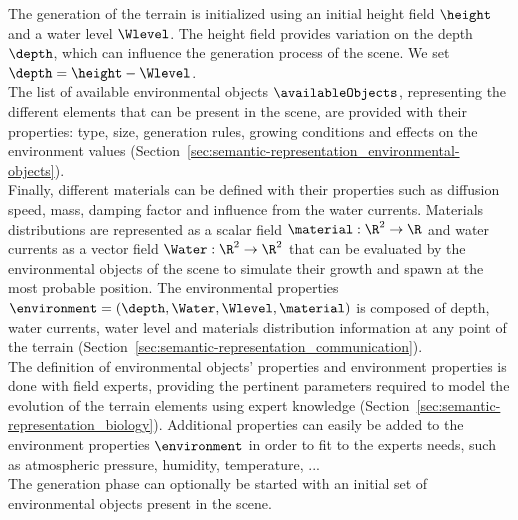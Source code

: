 The generation of the terrain is initialized using an initial height field $\height$ and a water level $\Wlevel$. The height field provides variation on the depth $\depth$, which can influence the generation process of the scene. We set $\depth = \height - \Wlevel$. \\
The list of available environmental objects $\availableObjects$, representing the different elements that can be present in the scene, are provided with their properties: type, size, generation rules, growing conditions and effects on the environment values (Section~\ref{sec:semantic-representation_environmental-objects}). \\
Finally, different materials can be defined with their properties such as diffusion speed, mass, damping factor and influence from the water currents. Materials distributions are represented as a scalar field $\material: \R^2 \to \R$ and water currents as a vector field $\Water: \R^2 \to \R^2$ that can be evaluated by the environmental objects of the scene to simulate their growth and spawn at the most probable position. The environmental properties $\environment = (\depth, \Water, \Wlevel, \material)$ is composed of depth, water currents, water level and materials distribution information at any point of the terrain (Section~\ref{sec:semantic-representation_communication}). \\
The definition of environmental objects' properties and environment properties is done with field experts, providing the pertinent parameters required to model the evolution of the terrain elements using expert knowledge (Section~\ref{sec:semantic-representation_biology}). Additional properties can easily be added to the environment properties $\environment$ in order to fit to the experts needs, such as atmospheric pressure, humidity, temperature, ... \\
The generation phase can optionally be started with an initial set of environmental objects present in the scene. 

